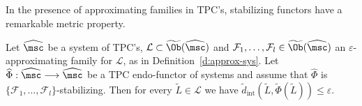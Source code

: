   In the presence of approximating families in TPC's,
    stabilizing functors have a remarkable metric property.
    \begin{prop} \label{p:stab-func} Let $\widehat{\msc}$ be a system
      of TPC's, $\mathcal{L} \subset \widetilde{\Ob}(\widehat{\msc})$
      and
      $\mathcal{F}_1, \ldots, \mathcal{F}_l \in
      \widetilde{\Ob}(\widehat{\msc})$ an $\varepsilon$-approximating
      family for $\mathcal{L}$, as in Definition~\ref{d:approx-sys}.
      Let
      $\widehat{\Phi}: \widehat{\msc} \longrightarrow \widehat{\msc}$
      be a TPC endo-functor of systems and assume that
      $\widehat{\Phi}$ is
      $\{\mathcal{F}_1, \ldots, \mathcal{F}_l\}$-stabilizing. Then for
      every $\widetilde{L} \in \mathcal{L}$ we have
      $\widetilde{d}_{\text{int}}(\widetilde{L},
      \widetilde{\Phi}(\widetilde{L})) \leq \varepsilon$.
  \end{prop}